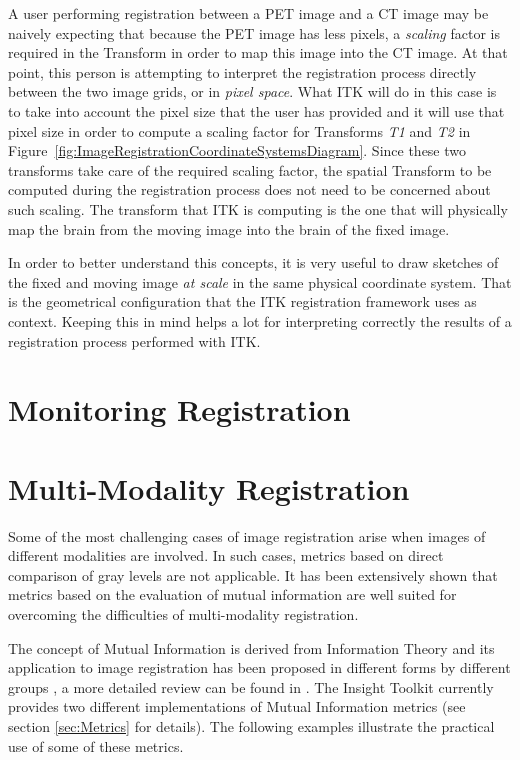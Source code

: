 A user performing registration between a PET image and a CT image may be
naively expecting that because the PET image has less pixels, a {\em scaling}
factor is required in the Transform in order to map this image into the CT
image. At that point, this person is attempting to interpret the registration
process directly between the two image grids, or in {\em pixel space}. What ITK
will do in this case is to take into account the pixel size that the user has
provided and it will use that pixel size in order to compute a scaling factor
for Transforms {\em T1} and {\em T2} in
Figure~\ref{fig:ImageRegistrationCoordinateSystemsDiagram}. Since these two
transforms take care of the required scaling factor, the spatial Transform to
be computed during the registration process does not need to be concerned about
such scaling. The transform that ITK is computing is the one that will
physically map the brain from the moving image into the brain of the fixed
image.

In order to better understand this concepts, it is very useful to draw sketches
of the fixed and moving image {\em at scale} in the same physical coordinate
system. That is the geometrical configuration that the ITK registration
framework uses as context. Keeping this in mind helps a lot for interpreting
correctly the results of a registration process performed with ITK.

\section{Monitoring Registration}
\label{sec:MonitoringImageRegistration}
\ifitkFullVersion

\fi



\section{Multi-Modality Registration}
\label{sec:MultiModalityRegistration}

Some of the most challenging cases of image registration arise when images of
different modalities are involved. In such cases, metrics based on direct
comparison of gray levels are not applicable. It has been extensively shown
that metrics based on the evaluation of mutual information are well suited for
overcoming the difficulties of multi-modality registration.


The concept of Mutual Information is derived from Information Theory and its
application to image registration has been proposed in different forms by
different groups \cite{Collignon1995,Maes97,Viola1997}, a more detailed review
can be found in \cite{Hajnal2001,Pluim2003}. The Insight Toolkit currently
provides two different implementations of Mutual Information metrics (see
section \ref{sec:Metrics} for details). The following examples illustrate the
practical use of some of these metrics.

